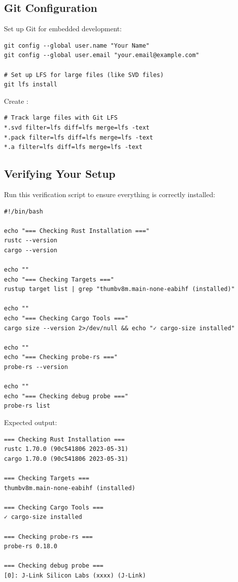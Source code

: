 \subsection{Git Configuration}
\label{subsec:git-config}

Set up Git for embedded development:
\begin{verbatim}
git config --global user.name "Your Name"
git config --global user.email "your.email@example.com"

# Set up LFS for large files (like SVD files)
git lfs install
\end{verbatim}

Create :
\begin{verbatim}
# Track large files with Git LFS
*.svd filter=lfs diff=lfs merge=lfs -text
*.pack filter=lfs diff=lfs merge=lfs -text
*.a filter=lfs diff=lfs merge=lfs -text
\end{verbatim}

\subsection{Verifying Your Setup}
\label{sec:verify-setup}

Run this verification script to ensure everything is correctly installed:
\begin{verbatim}
#!/bin/bash

echo "=== Checking Rust Installation ==="
rustc --version
cargo --version

echo ""
echo "=== Checking Targets ==="
rustup target list | grep "thumbv8m.main-none-eabihf (installed)"

echo ""
echo "=== Checking Cargo Tools ==="
cargo size --version 2>/dev/null && echo "✓ cargo-size installed"

echo ""
echo "=== Checking probe-rs ==="
probe-rs --version

echo ""
echo "=== Checking debug probe ==="
probe-rs list
\end{verbatim}

Expected output:
\begin{verbatim}
=== Checking Rust Installation ===
rustc 1.70.0 (90c541806 2023-05-31)
cargo 1.70.0 (90c541806 2023-05-31)

=== Checking Targets ===
thumbv8m.main-none-eabihf (installed)

=== Checking Cargo Tools ===
✓ cargo-size installed

=== Checking probe-rs ===
probe-rs 0.18.0

=== Checking debug probe ===
[0]: J-Link Silicon Labs (xxxx) (J-Link)
\end{verbatim}

